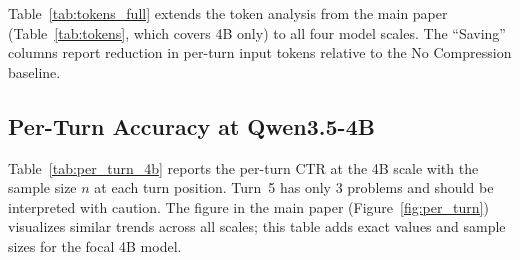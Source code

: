 Table~\ref{tab:tokens_full} extends the token analysis from the main paper (Table~\ref{tab:tokens}, which covers 4B only) to all four model scales. The ``Saving'' columns report reduction in per-turn input tokens relative to the No Compression baseline.

\begin{table}[h]
\centering
\small
{}
\caption{Average per-turn input tokens and percentage savings across all model scales. ``No Comp.'' = No Compression; ``Summary'' = Natural-Language Summary; ``SLSC w/o F.'' = SLSC without Lean~4; ``SLSC'' = SLSC with Lean~4.}
\label{tab:tokens_full}
\end{table}

\subsection{Per-Turn Accuracy at Qwen3.5-4B}
\label{app:per_turn_4b}

Table~\ref{tab:per_turn_4b} reports the per-turn CTR at the 4B scale with the sample size $n$ at each turn position. Turn~5 has only 3 problems and should be interpreted with caution. The figure in the main paper (Figure~\ref{fig:per_turn}) visualizes similar trends across all scales; this table adds exact values and sample sizes for the focal 4B model.

